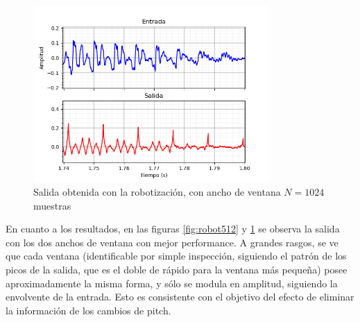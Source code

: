 \documentclass[assd_tp2_main.tex]{subfiles}
\begin{document}
\begin{figure}[htb]	
	\centering
	\includegraphics[width=0.8\textwidth]
	{graficos/EJ8/rochi/robotizacion_1024.png}
	\caption{Salida obtenida con la robotizaci\'on, con ancho de ventana $N=1024$ muestras}
	\label{fig:robot1024}
\end{figure}

En cuanto a los resultados, en las figuras \ref{fig:robot512} y \ref{fig:robot1024} se observa la salida con los dos anchos de ventana con mejor performance. A grandes rasgos, se ve que cada ventana (identificable por simple inspecci\'on, siguiendo el patr\'on de los picos de la salida, que es el doble de r\'apido para la ventana m\'as peque\~na) posee aproximadamente la misma forma, y s\'olo se modula en amplitud, siguiendo la envolvente de la entrada. Esto es consistente con el objetivo del efecto de eliminar la informaci\'on de los cambios de pitch.
\end{document}
